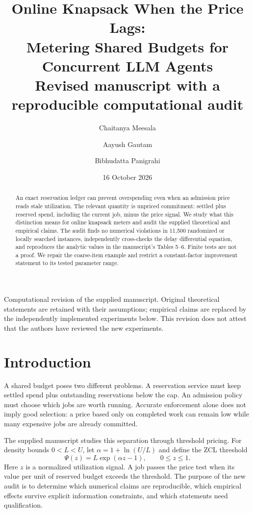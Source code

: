\documentclass[11pt]{article}
\title{Online Knapsack When the Price Lags:\\Metering Shared Budgets for Concurrent LLM Agents\\[0.6em]\large Revised manuscript with a reproducible computational audit}
\author{Chaitanya Meesala \and Aayush Gautam \and Bibhudatta Panigrahi}
\date{16 October 2026}
\begin{document}
\maketitle
\begin{center}\small Computational revision of the supplied manuscript. Original theoretical statements are retained with their assumptions; empirical claims are replaced by the independently implemented experiments below. This revision does not attest that the authors have reviewed the new experiments.\end{center}
\begin{abstract}
An exact reservation ledger can prevent overspending even when an admission price reads stale utilization. The relevant quantity is unpriced commitment: settled plus reserved spend, including the current job, minus the price signal. We study what this distinction means for online knapsack meters and audit the supplied theoretical and empirical claims. The audit finds no numerical violations in 11,500 randomized or locally searched instances, independently cross-checks the delay differential equation, and reproduces the analytic values in the manuscript's Tables 5--6. Finite tests are not a proof. We repair the coarse-item example and restrict a constant-factor improvement statement to its tested parameter range. %
\end{abstract}

\section{Introduction}
A shared budget poses two different problems. A reservation service must keep settled spend plus outstanding reservations below the cap. An admission policy must choose which jobs are worth running. Accurate enforcement alone does not imply good selection: a price based only on completed work can remain low while many expensive jobs are already committed.

The supplied manuscript studies this separation through threshold pricing. For density bounds $0<L<U$, let $\alpha=1+\ln(U/L)$ and define the ZCL threshold
\[\Psi(z)=L\exp(\alpha z-1),\qquad 0\le z\le1.\]
Here $z$ is a normalized utilization signal. A job passes the price test when its value per unit of reserved budget exceeds the threshold. The purpose of the new audit is to determine which numerical claims are reproducible, which empirical effects survive explicit information constraints, and which statements need qualification.
\end{document}
